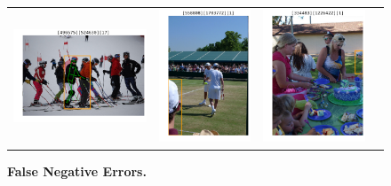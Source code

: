 \documentclass[10pt,onecolumn,letterpaper]{article}
\begin{document}
\begin{figure}[h!]
{\begin{tabular}{cc|cc}
\includegraphics[width=.25\linewidth,height=.15\paperwidth,keepaspectratio]{./result/rmpe/background_errors/false_negatives/bckd_false_neg_3.pdf} &
\includegraphics[width=.25\linewidth,height=.15\paperwidth,keepaspectratio]{./result/rmpe/background_errors/false_negatives/bckd_false_neg_6.pdf} &
\includegraphics[width=.25\linewidth,height=.15\paperwidth,keepaspectratio]{./result/rmpe/background_errors/false_negatives/bckd_false_neg_7.pdf}\\
\end{tabular}
}
\caption{ {\small \textbf{False Negative Errors.}}}
\end{figure}
\clearpage

\end{document}

